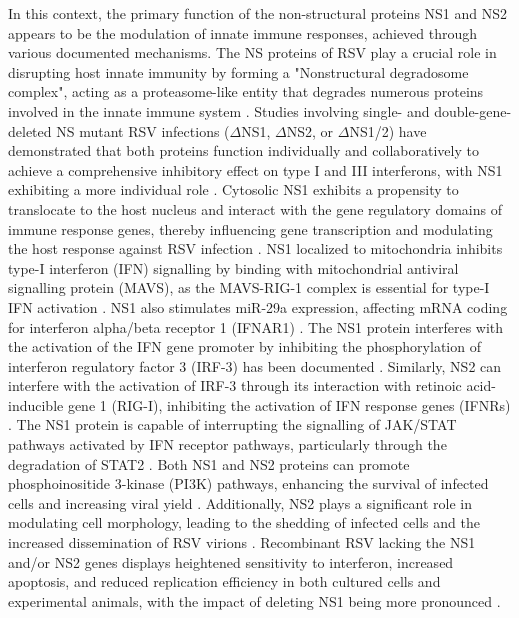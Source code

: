 In this context, the primary function of the non-structural proteins NS1 and NS2 appears to be the modulation of innate immune responses, achieved through various documented mechanisms. The NS proteins of RSV play a crucial role in disrupting host innate immunity by forming a "Nonstructural degradosome complex", acting as a proteasome-like entity that degrades numerous proteins involved in the innate immune system \cite{Boyoglu-Barnum2019BiologyDevelopment.}. Studies involving single- and double-gene-deleted NS mutant RSV infections (\(\Delta\)NS1, \(\Delta\)NS2, or \(\Delta\)NS1/2) have demonstrated that both proteins function individually and collaboratively to achieve a comprehensive inhibitory effect on type I and III interferons, with NS1 exhibiting a more individual role \cite{Sedeyn2019RespiratoryResponses, Spann2004SuppressionMacrophages}. Cytosolic NS1 exhibits a propensity to translocate to the host nucleus and interact with the gene regulatory domains of immune response genes, thereby influencing gene transcription and modulating the host response against RSV infection \cite{Pei2021Nuclear-localizedTranscription}. NS1 localized to mitochondria inhibits type-I interferon (IFN) signalling by binding with mitochondrial antiviral signalling protein (MAVS), as the MAVS-RIG-1 complex is essential for type-I IFN activation \cite{Boyapalle2012RespiratoryInfection}. NS1 also stimulates miR-29a expression, affecting mRNA coding for interferon alpha/beta receptor 1 (IFNAR1) \cite{Sedeyn2019RespiratoryResponses, Zhang2016RespiratoryReceptor}. The NS1 protein interferes with the activation of the IFN gene promoter by inhibiting the phosphorylation of interferon regulatory factor 3 (IRF-3) has been documented \cite{Spann2005EffectsCytokines}. Similarly, NS2 can interfere with the activation of IRF-3 through its interaction with retinoic acid-inducible gene 1 (RIG-I), inhibiting the activation of IFN response genes (IFNRs) \cite{Wright2006TheHumans}. The NS1 protein is capable of interrupting the signalling of JAK/STAT pathways activated by IFN receptor pathways, particularly through the degradation of STAT2 \cite{Wright2006TheHumans, Sedeyn2019RespiratoryResponses}. Both NS1 and NS2 proteins can promote phosphoinositide 3-kinase (PI3K) pathways, enhancing the survival of infected cells and increasing viral yield \cite{Wu2012TheBiology.}. Additionally, NS2 plays a significant role in modulating cell morphology, leading to the shedding of infected cells and the increased dissemination of RSV virions \cite{Sedeyn2019RespiratoryResponses, Liesman2014RSV-encodedObstruction}. Recombinant RSV lacking the NS1 and/or NS2 genes displays heightened sensitivity to interferon, increased apoptosis, and reduced replication efficiency in both cultured cells and experimental animals, with the impact of deleting NS1 being more pronounced \cite{Whitehead1999RecombinantChimpanzees, Teng2000RecombinantChimpanzees}.

